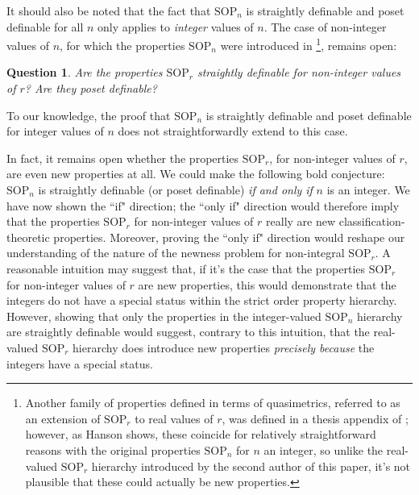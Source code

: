\documentclass[10pt,a4paper]{amsart}
\newtheorem{question}{Question}
\begin{document}
It should also be noted that the fact that $\mathrm{SOP}_{n}$ is straightly definable and poset definable for all $n$ only applies to \textit{integer} values of $n$. The case of non-integer values of $n$, for which the properties $\mathrm{SOP}_{n}$ were introduced in \cite{mutchnik2025approximations}\footnote{Another family of properties defined in terms of quasimetrics, referred to as an extension of $\mathrm{SOP}_{r}$ to real values of $r$, was defined in a thesis appendix of \cite{hanson2020definability}; however, as Hanson shows, these coincide  for relatively straightforward reasons with the original properties $\mathrm{SOP}_{n}$ for $n$ an integer, so unlike the real-valued $\mathrm{SOP}_{r}$ hierarchy introduced by the second author of this paper, it's not plausible that these could actually be new properties.}, remains open: 

\begin{question}
    Are the properties $\mathrm{SOP}_{r}$ straightly definable for non-integer values of $r$? Are they poset definable?
\end{question}


To our knowledge, the proof that $\mathrm{SOP}_{n}$ is straightly definable and poset definable for integer values of $n$ does not straightforwardly extend to this case.

In fact, it remains open whether the properties $\mathrm{SOP}_{r}$, for non-integer values of $r$, are even new properties at all. We could make the following bold conjecture: $\mathrm{SOP}_{n}$ is straightly definable (or poset definable) \textit{if and only if} $n$ is an integer. We have now shown the ``if" direction; the ``only if" direction would therefore imply that the properties $\mathrm{SOP}_{r}$ for non-integer values of $r$ really are new classification-theoretic properties. Moreover, proving the ``only if" direction would reshape our understanding of the nature of the newness problem for non-integral $\mathrm{SOP}_{r}$. A reasonable intuition may suggest that, if it's the case that the properties $\mathrm{SOP}_{r}$ for non-integer values of $r$ are new properties, this would demonstrate that the integers do not have a special status within the strict order property hierarchy. However, showing that only the properties in the integer-valued $\mathrm{SOP}_{n}$ hierarchy are straightly definable would suggest, contrary to this intuition, that the real-valued $\mathrm{SOP}_{r}$ hierarchy does introduce new properties \textit{precisely because} the integers have a special status.
\end{document}

